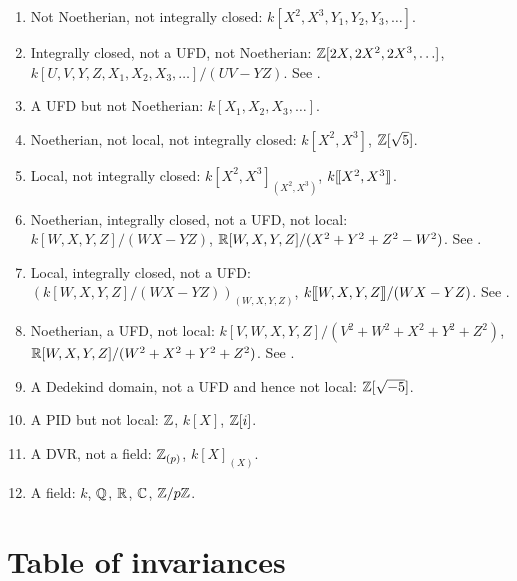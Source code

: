 \documentclass{ximera}
\begin{document}
\begin{multicols}{2}
\begin{enumerate}
\item\label{A:domain} Not Noetherian, not integrally closed:
$k[X^2,X^3,Y_1,Y_2,Y_3,\ldots]$.


\item\label{A:ic} Integrally closed, not a UFD, not Noetherian:
  $\mathbb Z[2X,2X^2,2X^3,\ldots]$, $k[U,V,Y,Z,X_1,X_2,X_3,\ldots]/(UV -
  YZ)$.  See \cite{hH1981}.

\item\label{A:ufd} A UFD but not Noetherian: $k[X_1,X_2,X_3,\ldots]$.

\item\label{A:n} Noetherian, not local, not integrally closed: $k[X^2,X^3]$, $\mathbb Z[\sqrt{5}]$. 

\item\label{A:l} Local, not integrally closed: $k[X^2,X^3]_{(X^2,X^3)}$, $k[\hspace{-0.25ex}[ X^2, X^3 ]\hspace{-0.25ex}]$.

\item\label{A:ni} Noetherian, integrally closed, not a UFD, not local:
  $k[W,X,Y,Z]/(WX - YZ)$, $\mathbb R[W,X,Y,Z]/(X^2 + Y^2 + Z^2 - W^2)$. See
  \cite{hH1981}.

\item\label{A:nil} Local, integrally closed, not a UFD:
  $\left(k[W,X,Y,Z]/(WX - YZ)\right)_{(W,X,Y,Z)}$, $k[\hspace{-0.25ex}[ W,X,Y,Z ]\hspace{-0.25ex}]
  / (WX - YZ)$. See \cite{hH1981}.


\item\label{A:nu} Noetherian, a UFD, not local: $k[V,W,X,Y,Z]/(V^2 +
  W^2 + X^2 + Y^2 + Z^2)$, $\mathbb R[W,X,Y,Z]/(W^2 + X^2 + Y^2 + Z^2)$. See
  \cite{hH1981}.
  
\item\label{A:dd} A Dedekind domain, not a UFD and hence not local: $\mathbb Z[\sqrt{-5}]$.

\item\label{A:pid} A PID but not local: $\mathbb Z$, $k[X]$, $\mathbb Z[i]$.

\item\label{A:dvr} A DVR, not a field: $\mathbb Z_{(p)}$, $k[X]_{(X)}$.

\item\label{A:field} A field: $k$, $\mathbb Q$, $\mathbb R$, $\mathbb C$, $\mathbb Z/p\mathbb Z$.

\end{enumerate}
\end{multicols}

\newpage

\section{Table of invariances}
\end{document}
